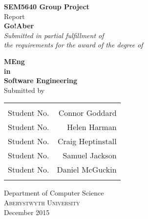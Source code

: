 \begin{titlepage}

\begin{center}

\textup{\small {\bf SEM5640 Group Project} \\ Report}\\[0.2in]

\Large \textbf {Go!Aber}\\[0.5in]

       \small \emph{Submitted in partial fulfillment of\\
        the requirements for the award of the degree of}
        \vspace{.2in}

       {\bf MEng  \\in\\ Software Engineering}\\[0.5in]

\normalsize Submitted by \\
\begin{table}[h]
\centering
\begin{tabular}{lr}\hline \\
Student No. & Connor Goddard \\
Student No. & Helen Harman \\ 
Student No. & Craig Heptinstall \\
Student No. & Samuel Jackson \\ 
Student No. & Daniel McGuckin \\ \\ \hline 
\end{tabular}
\end{table}

\vspace{.1in}

\Large{Department of Computer Science}\\
\normalsize
\textsc{Aberystwyth University}\\
\vspace{4.2cm}
December 2015

\end{center}

\end{titlepage}
